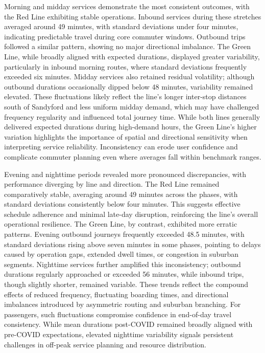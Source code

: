     Morning and midday services demonstrate the most consistent outcomes, with the Red Line exhibiting stable operations. Inbound services during these stretches averaged around 49 minutes, with standard deviations under four minutes, indicating predictable travel during core commuter windows. Outbound trips followed a similar pattern, showing no major directional imbalance. The Green Line, while broadly aligned with expected durations, displayed greater variability, particularly in inbound morning routes, where standard deviations frequently exceeded six minutes. Midday services also retained residual volatility; although outbound durations occasionally dipped below 48 minutes, variability remained elevated. These fluctuations likely reflect the line’s longer inter-stop distances south of Sandyford and less uniform midday demand, which may have challenged frequency regularity and influenced total journey time. While both lines generally delivered expected durations during high-demand hours, the Green Line’s higher variation highlights the importance of spatial and directional sensitivity when interpreting service reliability. Inconsistency can erode user confidence and complicate commuter planning even where averages fall within benchmark ranges.

    Evening and nighttime periods revealed more pronounced discrepancies, with performance diverging by line and direction. The Red Line remained comparatively stable, averaging around 49 minutes across the phases, with standard deviations consistently below four minutes. This suggests effective schedule adherence and minimal late-day disruption, reinforcing the line’s overall operational resilience. The Green Line, by contrast, exhibited more erratic patterns. Evening outbound journeys frequently exceeded 48.5 minutes, with standard deviations rising above seven minutes in some phases, pointing to delays caused by operation gaps, extended dwell times, or congestion in suburban segments. Nighttime services further amplified this inconsistency; outbound durations regularly approached or exceeded 56 minutes, while inbound trips, though slightly shorter, remained variable. These trends reflect the compound effects of reduced frequency, fluctuating boarding times, and directional imbalances introduced by asymmetric routing and suburban branching. For passengers, such fluctuations compromise confidence in end-of-day travel consistency. While mean durations post-COVID remained broadly aligned with pre-COVID expectations, elevated nighttime variability signals persistent challenges in off-peak service planning and resource distribution.

